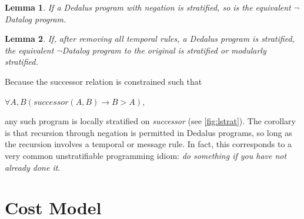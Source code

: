 \documentclass{acm_proc_article-sp-sigmod09}
\begin{document}
\newtheorem{lemma}{Lemma}
\begin{lemma}
If a Dedalus program with negation is stratified, so is the equivalent $\lnot$Datalog program.
\end{lemma}

\begin{lemma}
If, after removing all temporal rules, a Dedalus program is stratified, the equivalent $\lnot$Datalog program to the original
is stratified or modularly stratified.
\end{lemma}

 Because the successor relation is constrained
such that 

$\forall A,B (successor(A, B) \rightarrow B > A)$, 

any such program is locally stratified on \emph{successor} (see \ref{fig:lstrat}).  
The corollary is that recursion through negation
is permitted in Dedalus programs, so long as the recursion involves a temporal or message rule.
In fact, this corresponds to a very common unstratifiable programming idiom: \emph{do something
if you have not already done it}.

\section{Cost Model}
\end{document}
